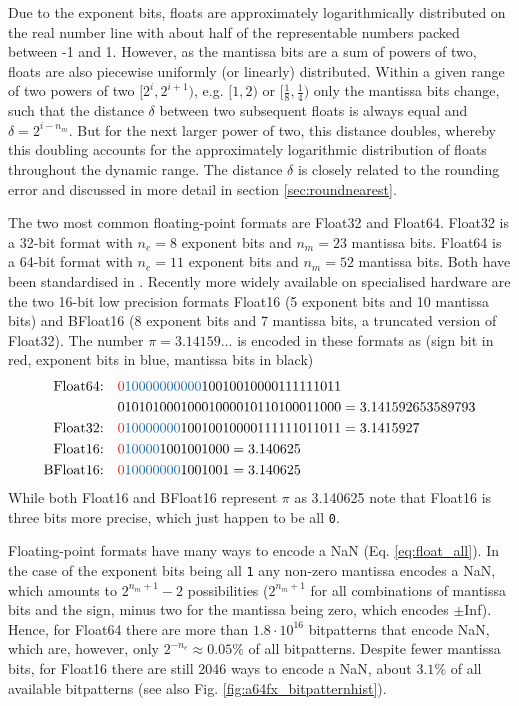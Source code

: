 Due to the exponent bits, floats are approximately logarithmically distributed on the real number line with about half of the representable
numbers packed between -1 and 1. However, as the mantissa bits are a sum of powers of two, floats
are also piecewise uniformly (or linearly) distributed. Within a given range of two powers of two $[2^i,2^{i+1})$, e.g. $[1,2)$ or
$[\tfrac{1}{8},\tfrac{1}{4})$ only the mantissa bits change, such that the distance $\delta$ between two subsequent 
floats is always equal and $\delta = 2^{i-n_m}$. But for the next larger power of two, this distance doubles, whereby
this doubling accounts for the approximately logarithmic distribution of floats throughout the dynamic range. The distance $\delta$ is
closely related to the rounding error and discussed in more detail in section \ref{sec:roundnearest}.

The two most common floating-point formats are Float32 and Float64. Float32 is a 32-bit format with $n_e=8$ exponent bits and
$n_m=23$ mantissa bits. Float64 is a 64-bit format with $n_e=11$ exponent bits and $n_m=52$ mantissa bits. Both have been 
standardised in \cite{IEEE1985}. Recently more widely available on specialised hardware are the two 16-bit low precision formats
Float16 (5 exponent bits and 10 mantissa bits) and BFloat16 (8 exponent bits and 7 mantissa bits, a truncated version of Float32).
The number $\pi = 3.14159...$ is encoded in these formats as (sign bit in red, exponent bits in blue, mantissa bits in black)
\begin{align}
\text{Float64:}& \quad {\color{psign}0}{\color{pexpo}10000000000}10010010000111111011 \nonumber \\
			& \quad 01010100010001000010110100011000 = 3.141592653589793 \nonumber \\
\text{Float32:}& \quad {\color{psign}0}{\color{pexpo}10000000}10010010000111111011011 = 3.1415927 \nonumber \\
\text{Float16:}& \quad {\color{psign}0}{\color{pexpo}10000}1001001000 = 3.140625 \nonumber \\
\text{BFloat16:}& \quad {\color{psign}0}{\color{pexpo}10000000}1001001 = 3.140625
\end{align}
While both Float16 and BFloat16 represent $\pi$ as 3.140625 note that Float16 is three bits more precise, which just happen to be all \texttt{0}.

Floating-point formats have many ways to encode a NaN (Eq. \ref{eq:float_all}). In the case of the exponent bits being all \texttt{1} any non-zero
mantissa encodes a NaN, which amounts to $2^{n_m+1}-2$ possibilities ($2^{n_m+1}$ for all combinations of mantissa bits and the sign,
minus two for the mantissa being zero, which encodes $\pm$Inf). Hence, for Float64 there are more than $1.8 \cdot 10^{16}$ bitpatterns
that encode NaN, which are, however, only $2^{-n_e} \approx 0.05\%$ of all bitpatterns. Despite fewer mantissa bits, for Float16 there are
still 2046 ways to encode a NaN, about $3.1\%$ of all available bitpatterns (see also Fig. \ref{fig:a64fx_bitpatternhist}).

